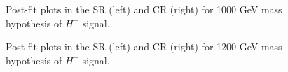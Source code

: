 \begin{figure}[H]
  \centering
  \caption{Post-fit plots in the SR (left) and CR (right) for 1000 GeV mass hypothesis of $H^{+}$ signal.}
  \label{fig:Postfit_Hp1000_Asimov}
\end{figure}
\begin{figure}[H]
  \centering
  \caption{Post-fit plots in the SR (left) and CR (right) for 1200 GeV mass hypothesis of $H^{+}$ signal.}
  \label{fig:Postfit_Hp1000_Asimov}
\end{figure}
